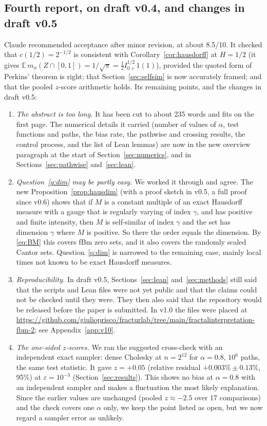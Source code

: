 \documentclass[11pt]{article}
\theoremstyle{remark}
\theoremstyle{definition}
\newcommand{\E}{\mathbb{E}}
\begin{document}
\subsection{Fourth report, on draft v0.4, and changes in draft v0.5}\label{app:referee4}
Claude recommended acceptance after minor revision, at about 8.5/10. It checked that $c(1/2)=2^{-1/2}$ is consistent with Corollary~\ref{cor:hausdorff} at $H=1/2$ (it gives $\E\,m_\phi(Z\cap[0,1])=1/\sqrt\pi=\tfrac12 I^{1/2}_{0+}1(1)$), provided the quoted form of Perkins' theorem is right; that Section~\ref{sec:selfsim} is now accurately framed; and that the pooled $z$-score arithmetic holds. Its remaining points, and the changes in draft v0.5:
\begin{enumerate}
\item \emph{The abstract is too long.} It has been cut to about 235 words and fits on the first page. The numerical details it carried (number of values of $\alpha$, test functions and paths, the bias rate, the pathwise and crossing results, the control process, and the list of Lean lemmas) are now in the new overview paragraph at the start of Section~\ref{sec:numerics}, and in Sections~\ref{sec:pathwise} and~\ref{sec:lean}.
\item \emph{Question~\ref{q:dim} may be partly easy.} We worked it through and agree. The new Proposition~\ref{prop:hausdim} (with a proof sketch in v0.5, a full proof since v0.6) shows that if $M$ is a constant multiple of an exact Hausdorff measure with a gauge that is regularly varying of index $\gamma$, and has positive and finite intensity, then $M$ is self-similar of index $\gamma$ and the set has dimension $\gamma$ where $M$ is positive. So there the order equals the dimension. By \eqref{eq:BM} this covers fBm zero sets, and it also covers the randomly scaled Cantor sets. Question~\ref{q:dim} is narrowed to the remaining case, mainly local times not known to be exact Hausdorff measures.
\item \emph{Reproducibility.} In draft v0.5, Sections~\ref{sec:lean} and~\ref{sec:methods} still said that the scripts and Lean files were not yet public and that the claims could not be checked until they were. They then also said that the repository would be released before the paper is submitted. In v1.0 the files were placed at \url{https://github.com/giulioprisco/fracturlab/tree/main/fractalinterpretation-fbm-2}; see Appendix~\ref{app:v10}.
\item \emph{The one-sided $z$-scores.} We ran the suggested cross-check with an independent exact sampler: dense Cholesky at $n=2^{12}$ for $\alpha=0.8$, $10^6$ paths, the same test statistic. It gave $z=+0.05$ (relative residual $+0.003\%\pm0.13\%$, 95\%) at $\varepsilon=10^{-3}$ (Section~\ref{sec:results}). This shows no bias at $\alpha=0.8$ with an independent sampler and makes a fluctuation the most likely explanation. Since the earlier values are unchanged (pooled $z\approx-2.5$ over 17 comparisons) and the check covers one $\alpha$ only, we keep the point listed as open, but we now regard a sampler error as unlikely.

\end{enumerate}
\end{document}
